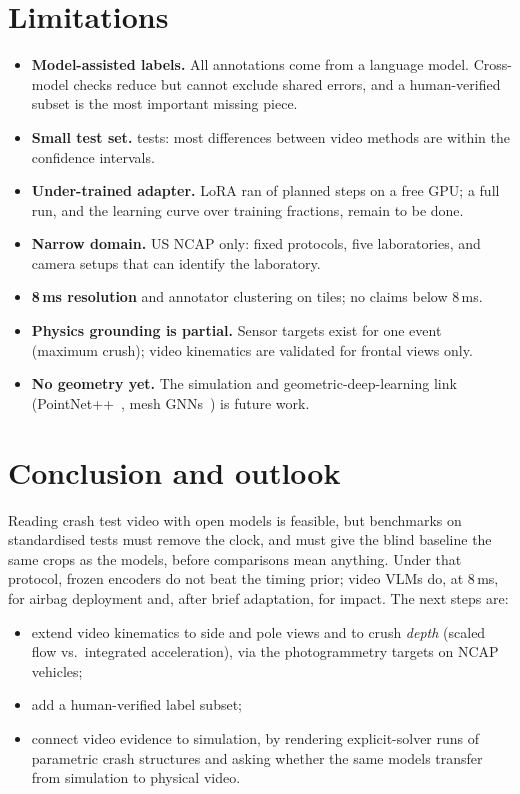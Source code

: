 \documentclass[10pt,twocolumn]{article}
\begin{document}
\section{Limitations}
\begin{itemize}\setlength\itemsep{0pt}
\item \textbf{Model-assisted labels.} All annotations come from a language model. Cross-model
checks reduce but cannot exclude shared errors, and a human-verified subset is the most
important missing piece.
\item \textbf{Small test set.} \NTestTests{} tests: most differences between video methods are
within the confidence intervals.
\item \textbf{Under-trained adapter.} LoRA ran \LoraSteps{} of \LoraPlannedSteps{} planned steps
on a free GPU; a full run, and the learning curve over training fractions, remain to be done.
\item \textbf{Narrow domain.} US NCAP only: fixed protocols, five laboratories, and camera setups
that can identify the laboratory.
\item \textbf{8\,ms resolution} and annotator clustering on tiles; no claims below 8\,ms.
\item \textbf{Physics grounding is partial.} Sensor targets exist for one event (maximum crush); video kinematics are validated for frontal views only.
\item \textbf{No geometry yet.} The simulation and geometric-deep-learning link
(PointNet++~\citep{qi2017pointnetpp}, mesh GNNs~\citep{pfaff2020meshgraphnets}) is future work.
\end{itemize}

\section{Conclusion and outlook}
Reading crash test video with open models is feasible, but benchmarks on standardised tests must
remove the clock, and must give the blind baseline the same crops as the models, before
comparisons mean anything. Under that protocol, frozen encoders do not beat the timing prior;
video VLMs do, at 8\,ms, for airbag deployment and, after brief adaptation, for impact. The next steps are:
\begin{itemize}\setlength\itemsep{0pt}
\item extend video kinematics to side and pole views and to crush \emph{depth} (scaled flow vs.\ integrated acceleration), via the photogrammetry targets on NCAP vehicles;
\item add a human-verified label subset;
\item connect video evidence to simulation, by rendering explicit-solver runs of parametric
crash structures and asking whether the same models transfer from simulation to physical
video.
\end{itemize}
\end{document}
